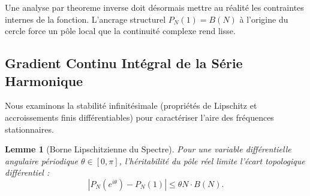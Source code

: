 \documentclass[12pt,a4paper]{article}
\newtheorem{lemma}[theorem]{Lemme}
\begin{document}
Une analyse par theoreme inverse doit d\'esormais mettre au r\'ealit\'e les contraintes internes de la fonction. L'ancrage structurel $P_N(1) = B(N)$ \`a l'origine du cercle force un p\^ole local que la continuit\'e complexe rend lisse.

\subsection{Gradient Continu Int\'egral de la S\'erie Harmonique}

Nous examinons la stabilit\'e infinit\'esimale (propri\'et\'es de Lipschitz et accroissements finis diff\'erentiables) pour caract\'eriser l'aire des fr\'equences stationnaires.

\begin{lemma}[Borne Lipschitzienne du Spectre]
Pour une variable diff\'erentielle angulaire p\'eriodique $\theta \in [0, \pi]$, l'h\'eritabilit\'e du p\^ole r\'eel limite l'\'ecart topologique diff\'erentiel :
\begin{equation}
| P_N(e^{i\theta}) - P_N(1) | \le \theta N \cdot B(N).
\end{equation}
\end{lemma}
\end{document}

